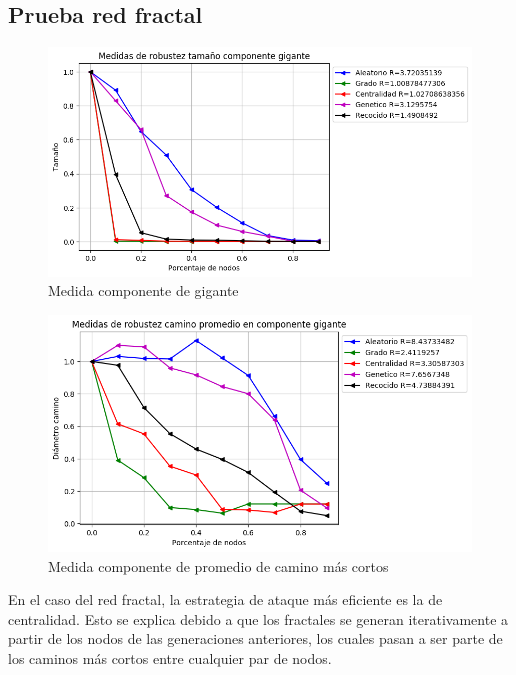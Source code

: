 \subsection{Prueba red fractal}

\begin{figure}[H]
    \centering
    \includegraphics[scale=0.7]{Capitulo5Robustez/imagenes/grafica_GC20180501_151350floweru1v3.png}
    \caption{Medida componente de gigante}
\end{figure}


\begin{figure}[H]
    \centering
    \includegraphics[scale=0.7]{Capitulo5Robustez/imagenes/grafica_APL20180501_151350floweru1v3.png}
    \caption{Medida componente de promedio de camino más cortos}
\end{figure}

En el caso del red fractal, la estrategia de ataque más eficiente es la de centralidad. Esto se explica debido a que los fractales se generan iterativamente a partir de los nodos de las generaciones anteriores, los cuales pasan a ser parte de los caminos más cortos entre cualquier par de nodos.